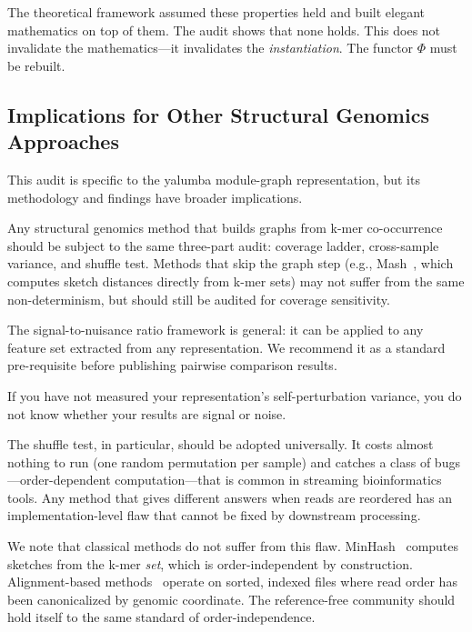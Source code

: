 \documentclass{../yalumba}
\begin{document}
The theoretical framework assumed these properties held and built
elegant mathematics on top of them.  The audit shows that none holds.
This does not invalidate the mathematics---it invalidates the
\emph{instantiation}.  The functor $\Phi$ must be rebuilt.

\subsection{Implications for Other Structural Genomics Approaches}

This audit is specific to the yalumba module-graph representation, but
its methodology and findings have broader implications.

Any structural genomics method that builds graphs from k-mer
co-occurrence should be subject to the same three-part audit: coverage
ladder, cross-sample variance, and shuffle test.  Methods that skip
the graph step (e.g., Mash~\cite{ondov2016mash}, which computes sketch
distances directly from k-mer sets) may not suffer from the same
non-determinism, but should still be audited for coverage sensitivity.

The signal-to-nuisance ratio framework is general: it can be applied to
any feature set extracted from any representation.  We recommend it as
a standard pre-requisite before publishing pairwise comparison results.

\begin{pullquote}
If you have not measured your representation's self-perturbation
variance, you do not know whether your results are signal or noise.
\end{pullquote}

The shuffle test, in particular, should be adopted universally.  It
costs almost nothing to run (one random permutation per sample) and
catches a class of bugs---order-dependent computation---that is common
in streaming bioinformatics tools.  Any method that gives different
answers when reads are reordered has an implementation-level flaw that
cannot be fixed by downstream processing.

We note that classical methods do not suffer from this flaw.
MinHash~\cite{ondov2016mash} computes sketches from the k-mer
\emph{set}, which is order-independent by construction.
Alignment-based methods~\cite{browning2012ibd, browning2020ibis}
operate on sorted, indexed files where read order has been canonicalized
by genomic coordinate.  The reference-free community should hold itself
to the same standard of order-independence.
\end{document}

